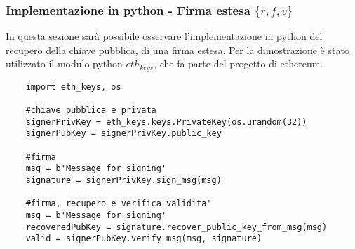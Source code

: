 \subsubsection{Implementazione in python - Firma estesa $\{r, f, v\}$}

In questa sezione sarà possibile osservare l'implementazione in python del recupero della chiave pubblica, di una firma estesa. Per la dimostrazione è stato utilizzato il modulo python $eth_{keys}$, che fa parte del progetto di ethereum. 

\begin{lstlisting}
	import eth_keys, os
	
	#chiave pubblica e privata
	signerPrivKey = eth_keys.keys.PrivateKey(os.urandom(32))
	signerPubKey = signerPrivKey.public_key
	
	#firma
	msg = b'Message for signing'
	signature = signerPrivKey.sign_msg(msg)
	
	#firma, recupero e verifica validita'
	msg = b'Message for signing'
	recoveredPubKey = signature.recover_public_key_from_msg(msg)
	valid = signerPubKey.verify_msg(msg, signature)
\end{lstlisting}
